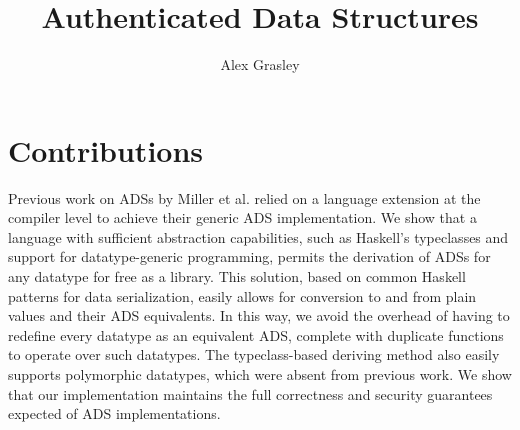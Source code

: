 \documentclass[11pt]{article}
\title{Authenticated Data Structures}
\author{Alex Grasley}
\begin{document}
\maketitle
\section{Contributions}

Previous work on ADSs by Miller et al. relied on a language extension at the compiler level to achieve their generic ADS implementation. We show that a language with sufficient abstraction capabilities, such as Haskell's typeclasses and support for datatype-generic programming, permits the derivation of ADSs for any datatype for free as a library. This solution, based on common Haskell patterns for data serialization, easily allows for conversion to and from plain values and their ADS equivalents. In this way, we avoid the overhead of having to redefine every datatype as an equivalent ADS, complete with duplicate functions to operate over such datatypes. The typeclass-based deriving method also easily supports polymorphic datatypes, which were absent from previous work. We show that our implementation maintains the full correctness and security guarantees expected of ADS implementations.
\end{document}

